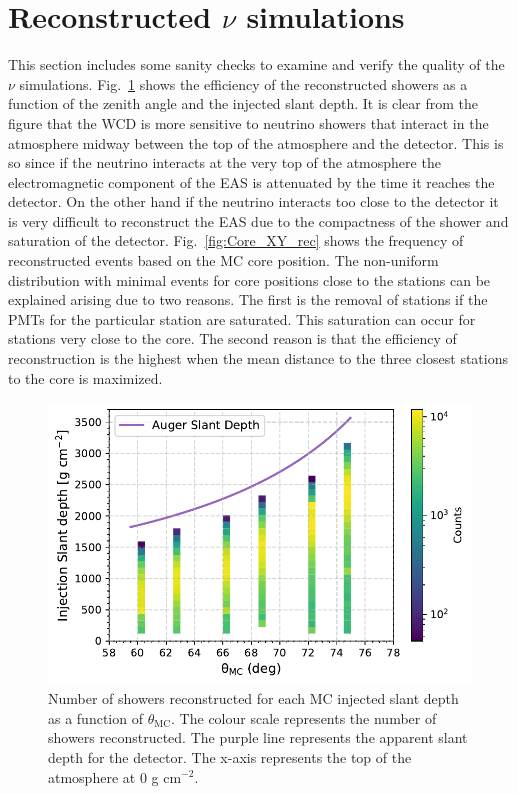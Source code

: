 \section{Reconstructed \texorpdfstring{$\nu$}{} simulations}
\label{sec:reco_possel}
This section includes some sanity checks to examine and verify the quality of the $\nu$ simulations. Fig.~\ref{fig:Slant_depth_rec} shows the efficiency of the reconstructed showers as a function of the zenith angle and the injected slant depth. It is clear from the figure that the WCD is more sensitive to neutrino showers that interact in the atmosphere midway between the top of the atmosphere and the detector. This is so since if the neutrino interacts at the very top of the atmosphere the electromagnetic component of the EAS is attenuated by the time it reaches the detector. On the other hand if the neutrino interacts too close to the detector it is very difficult to reconstruct the EAS due to the compactness of the shower and saturation of the detector. Fig.~\ref{fig:Core_XY_rec} shows the frequency of reconstructed events based on the MC core position. The non-uniform distribution with minimal events for core positions close to the stations can be explained arising due to two reasons. The first is the removal of stations if the PMTs for the particular station are saturated. This saturation can occur for stations very close to the core. The second reason is that the efficiency of reconstruction is the highest when the mean distance to the three closest stations to the core is maximized.

\begin{figure}[t!]
  \centering
  \includegraphics[width=14.5cm]{thesis_figures/Nu_analysis/MC_control/Slant_Depth_Profile_MC.pdf}
  \caption{Number of showers reconstructed for each MC injected slant depth as a function of $\theta_{\text{MC}}$. The colour scale represents the number of showers reconstructed. The purple line represents the apparent slant depth for the detector. The x-axis represents the top of the atmosphere at 0 g cm$^{-2}$.}
  \label{fig:Slant_depth_rec}
\end{figure}

